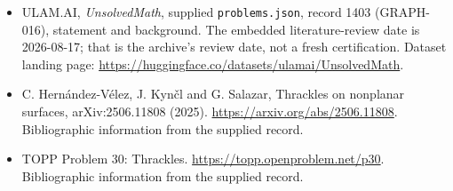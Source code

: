 \documentclass[11pt,a4paper]{article}
\begin{document}
{\small

\begin{itemize}

\item[\hypertarget{source:1403:1}{S1}] ULAM.AI, \emph{UnsolvedMath}, supplied \texttt{problems.json}, record 1403 (GRAPH-016), statement and background. The embedded literature-review date is 2026-08-17; that is the archive’s review date, not a fresh certification. Dataset landing page: \url{https://huggingface.co/datasets/ulamai/UnsolvedMath}.

\item[\hypertarget{source:1403:2}{S2}] C. Hernández-Vélez, J. Kynčl and G. Salazar, Thrackles on nonplanar surfaces, arXiv:2506.11808 (2025). \url{https://arxiv.org/abs/2506.11808}. Bibliographic information from the supplied record.

\item[\hypertarget{source:1403:3}{S3}] TOPP Problem 30: Thrackles. \url{https://topp.openproblem.net/p30}. Bibliographic information from the supplied record.

\end{itemize}

}

\label{end:1403}
\end{document}
